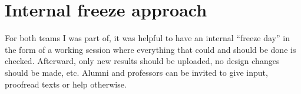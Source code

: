 
\section{Internal freeze approach}\label{sec:internal-freeze-approach}
For both teams I was part of, it was helpful to have an internal ``freeze day'' in the form of a working session where
everything that could and should be done is checked.
Afterward, only new results should be uploaded, no design changes should be made, etc.
Alumni and professors can be invited to give input, proofread texts or help otherwise.